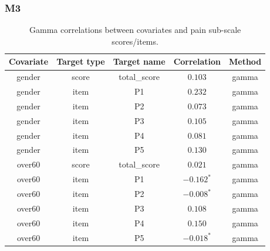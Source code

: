 \subsubsection{M3}
\begin{table}[H]
    \centering
    \begin{tabular}{c c c c c}
        \hline
        Covariate & Target type & Target name & Correlation & Method \\
        \hline
        gender & score & total\_score & $0.103$ & gamma \\
        gender & item & P1 & $0.232$ & gamma \\
        gender & item & P2 & $0.073$ & gamma \\
        gender & item & P3 & $0.105$ & gamma \\
        gender & item & P4 & $0.081$ & gamma \\
        gender & item & P5 & $0.130$ & gamma \\
        over60 & score & total\_score & $0.021$ & gamma \\
        over60 & item & P1 & $\mathbf{-0.162^*}$ & gamma \\
        over60 & item & P2 & $\mathbf{-0.008^*}$ & gamma \\
        over60 & item & P3 & $0.108$ & gamma \\
        over60 & item & P4 & $0.150$ & gamma \\
        over60 & item & P5 & $\mathbf{-0.018^*}$ & gamma \\
        \hline
    \end{tabular}
    \caption{Gamma correlations between covariates and pain sub-scale scores/items.}
    \label{tab:gamma_covariates_pain}
\end{table}

